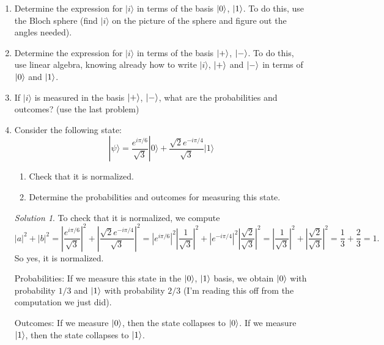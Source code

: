 \documentclass{article}
\theoremstyle{plain}
\theoremstyle{definition}
\theoremstyle{remark}
\newtheorem*{solution}{Solution}
\numberwithin{theorem}{section}
\begin{document}
\begin{enumerate}
\item Determine the expression for $| i \rangle$ in terms of the basis $|0 \rangle$, $|1\rangle$.  To do this, use the Bloch sphere (find $|i \rangle$ on the picture of the sphere and figure out the angles needed).
\item Determine the expression for $| i \rangle$ in terms of the basis $|+\rangle$, $|-\rangle$.  To do this, use linear algebra, knowing already how to write $|i\rangle$, $|+\rangle$ and $|-\rangle$ in terms of $|0 \rangle$ and $|1\rangle$.
\item If $| i \rangle$ is measured in the basis $|+\rangle$, $|-\rangle$, what are the probabilities and outcomes?  (use the last problem)
\item Consider the following state:
\[
|\psi \rangle =
\frac{ e^{i \pi/6}  }{\sqrt{3}} |0 \rangle +
\frac{ \sqrt{2} e^{-i \pi/4} }{\sqrt{3}} |1 \rangle
\]
\begin{enumerate}
    \item Check that it is normalized.
    \item Determine the probabilities and outcomes for measuring this state.
\end{enumerate}

\begin{solution}
To check that it is normalized, we compute
\[
|a|^2 + |b|^2 =
\left| \frac{ e^{i \pi/6}  }{\sqrt{3}}  \right|^2 + 
\left| \frac{ \sqrt{2} e^{-i \pi/4} }{\sqrt{3}} \right|^2
=
\left| e^{i \pi/6} \right|^2
\left| \frac{  1 }{\sqrt{3}}  \right|^2 + 
\left|e^{-i \pi/4} \right|^2
\left| \frac{ \sqrt{2}  }{\sqrt{3}} \right|^2
=
\left| \frac{  1 }{\sqrt{3}}  \right|^2 + 
\left| \frac{ \sqrt{2}  }{\sqrt{3}} \right|^2
= 
\frac{1}{3} + \frac{2}{3} = 1.
\]
So yes, it is normalized.

Probabilities:  If we measure this state in the $|0 \rangle$, $|1\rangle$ basis, we obtain $|0 \rangle$ with probability $1/3$ and $|1\rangle$ with probability $2/3$ (I'm reading this off from the computation we just did).

Outcomes:  If we measure $|0 \rangle$, then the state collapses to $|0 \rangle$.  If we measure $|1\rangle$, then the state collapses to $|1\rangle$.
\end{solution}


\end{enumerate}
\end{document}

